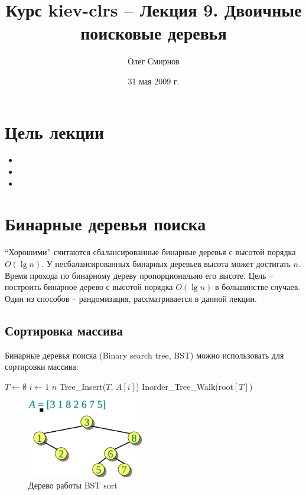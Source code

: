 \documentclass[11pt]{article}
\author{Олег Смирнов}
\title{Курс kiev-clrs -- Лекция 9. Двоичные поисковые деревья}
\date{31 мая 2009 г.}
\begin{document}
\maketitle
\tableofcontents

\newpage
\setlength{\parskip}{1ex plus 0.5ex minus 0.2ex}
\section{Цель лекции}
\begin{itemize}
\item 
\item 
\item 
\end{itemize}

\section{Бинарные деревья поиска}

``Хорошими'' считаются сбалансированные бинарные деревья с высотой порядка $O(\lg n)$. У несбалансированных бинарных деревьев высота может достигать $n$. Время прохода по бинарному дереву пропорционально его высоте. Цель -- построить бинарное дерево с высотой порядка $O(\lg n)$ в большинстве случаев. Один из способов -- рандомизация, рассматривается в данной лекции.

\subsection{Сортировка массива}

Бинарные деревья поиска (Binary search tree, BST) можно использовать для сортировки массива:
\begin{codebox}
\li $T \gets \emptyset $
\li \For $i \gets 1$ \To $n$
\li \Do Tree\_Insert($T$, $A[i]$)
  \End
\li Inorder\_Tree\_Walk(root$[T]$)
\end{codebox}

\begin{figure}[ht]
  \centering
  \includegraphics[width=2in]{lecture9/bs_tree.eps}
  \caption{Дерево работы BST sort}
  \label{fig:bs_tree}
\end{figure}
\end{document}
